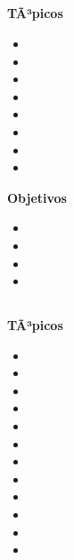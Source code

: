 \subsection{\NCOCHODef }\label{sec:BOK-NC8}

\textbf{TÃ³picos}
\begin{itemize}
	\item \NCOCHOTopicSonido
	\item \NCOCHOTopicEstandares
	\item \NCOCHOTopicPlaneamiento
	\item \NCOCHOTopicDispositivos
	\item \NCOCHOTopicTeclado
	\item \NCOCHOTopicEstandaresde
	\item \NCOCHOTopicServidores
	\item \NCOCHOTopicHerramientas
\end{itemize}

\textbf{Objetivos}
\begin{itemize}
	\item \NCOCHOObjUNO
	\item \NCOCHOObjDOS
	\item \NCOCHOObjTRES
	\item \NCOCHOObjCUATRO
\end{itemize}

\subsection{\NCNUEVEDef }\label{sec:BOK-NC9}

\textbf{TÃ³picos}
\begin{itemize}
	\item \NCNUEVETopicVista
	\item \NCNUEVETopicLos
	\item \NCNUEVETopicRedes
	\item \NCNUEVETopicCiclos
	\item \NCNUEVETopicProtocolos
	\item \NCNUEVETopicAdaptacion
	\item \NCNUEVETopicExtension
	\item \NCNUEVETopicAcceso
	\item \NCNUEVETopicSoporte
	\item \NCNUEVETopicEl
	\item \NCNUEVETopicProblemas
	\item \NCNUEVETopicTecnologias
\end{itemize}

